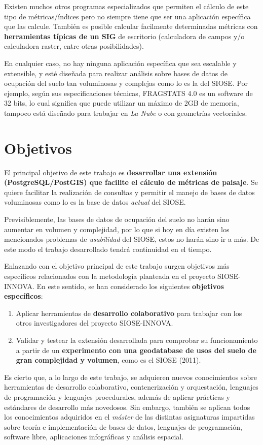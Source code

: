 Existen muchos otros programas especializados que permiten el cálculo de este tipo de métricas/índices pero no siempre tiene que ser una aplicación específica que las calcule. También es posible calcular facilmente determinadas métricas con \textbf{herramientas típicas de un SIG} de escritorio (calculadora de campos y/o calculadora raster, entre otras posibilidades).

En cualquier caso, no hay ninguna aplicación específica que sea escalable y extensible, y esté diseñada para realizar análisis sobre bases de datos de ocupación del suelo tan voluminosas y complejas como lo es la del SIOSE. Por ejemplo, según sus especificaciones técnicas, FRAGSTATS 4.0 es un software de 32 bits, lo cual significa que puede utilizar un máximo de 2GB de memoria, tampoco está diseñado para trabajar en \textit{La Nube} o con geometrías vectoriales.


\section{Objetivos}\label{sec:objetivos}

El principal objetivo de este trabajo es \textbf{desarrollar una extensión (PostgreSQL/PostGIS) que facilite el cálculo de métricas de paisaje}. Se quiere facilitar la realización de consultas y permitir el manejo de bases de datos voluminosas como lo es la base de datos \textit{actual} del SIOSE. 

Previsiblemente, las bases de datos de ocupación del suelo no harán sino aumentar en volumen y complejidad, por lo que si hoy en día existen los mencionados problemas de \textit{usabilidad} del SIOSE, estos no harán sino ir a más. De este modo el trabajo desarrollado tendrá continuidad en el tiempo.

Enlazando con el objetivo principal de este trabajo surgen objetivos más específicos relacionados con la metodología planteada en el proyecto SIOSE-INNOVA. En este sentido, se han considerado los siguientes \textbf{objetivos específicos}:
\begin{enumerate}
\item Aplicar herramientas de \textbf{desarrollo colaborativo} para trabajar con los otros investigadores del proyecto SIOSE-INNOVA.
\item Validar y testear la extensión desarrollada para comprobar su funcionamiento a partir de un \textbf{experimento con una geodatabase de usos del suelo de gran complejidad y volumen}, como es el SIOSE (2011).
\end{enumerate}

Es cierto que, a lo largo de este trabajo, se adquieren nuevos conocimientos sobre herramientas de desarrollo colaborativo, contenerización y orquestación, lenguajes de programación y lenguajes procedurales, además de aplicar prácticas y estándares de desarrollo más novedosos. Sin embargo, también se aplican todos los conocimientos adquiridos en el \textit{máster} de las distintas asignaturas impartidas sobre teoría e implementación de bases de datos, lenguajes de programación, software libre, aplicaciones infográficas y análisis espacial.


